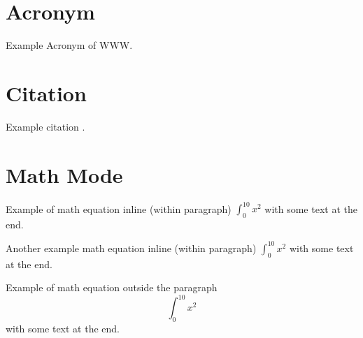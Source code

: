\section{Acronym}
Example Acronym of \ac{WWW}.

\section{Citation}

Example citation \cite{shannon1949communication}.

\section{Math Mode}


Example of math equation inline (within paragraph) $ \int_{0}^{10} x^2 $ with some text at the end.

Another example math equation inline (within paragraph) \( \int_{0}^{10} x^2 \) with some text at the end.

Example of math equation outside the paragraph \[ \int_{0}^{10} x^2 \] with some text at the end.

